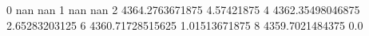 0 nan nan
1 nan nan
2 4364.2763671875 4.57421875
4 4362.35498046875 2.65283203125
6 4360.71728515625 1.01513671875
8 4359.7021484375 0.0
